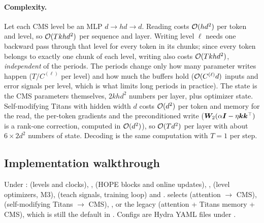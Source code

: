 \paragraph{Complexity.} Let each CMS level be an MLP $d \to hd \to d$. Reading costs $\mathcal{O}(hd^2)$
per token and level, so $\mathcal{O}(Tkhd^2)$ per sequence and layer. Writing level $\ell$ needs one
backward pass through that level for every token in its chunks; since every token belongs to
exactly one chunk of each level, writing also costs $\mathcal{O}(Tkhd^2)$, \emph{independent} of the
periods. The periods change only how many parameter writes happen ($T/C^{(\ell)}$ per level) and
how much the buffers hold ($\mathcal{O}(C^{(\ell)}d)$ inputs and error signals per level, which is what
limits long periods in practice). The state is the CMS parameters themselves, $2khd^2$ numbers per
layer, plus optimizer state. Self-modifying Titans with hidden width $d$ costs $\mathcal{O}(d^2)$ per
token and memory for the read, the per-token gradients and the preconditioned write
($\bm{W}_2(\alpha\bm{I} - \eta\bm{k}\bm{k}^{\top})$ is a rank-one correction, computed in $\mathcal{O}(d^2)$), so
$\mathcal{O}(Td^2)$ per layer with about $6\times2d^2$ numbers of state. Decoding is the same
computation with $T = 1$ per step.

\subsection{Implementation walkthrough}\label{sec:c11-nl-code}

\begin{implnote}[title={In the code: layout of the reproduction}]
Under : 
(levels and clocks), ,  (HOPE blocks and online updates),
,  (level optimizers, M3),  (teach
signals, training loop) and .  selects  (attention $\to$ CMS),
 (self-modifying Titans $\to$ CMS), , or the legacy
 (attention + Titans memory + CMS), which is still the default in
. Configs are Hydra YAML files under .
\end{implnote}

